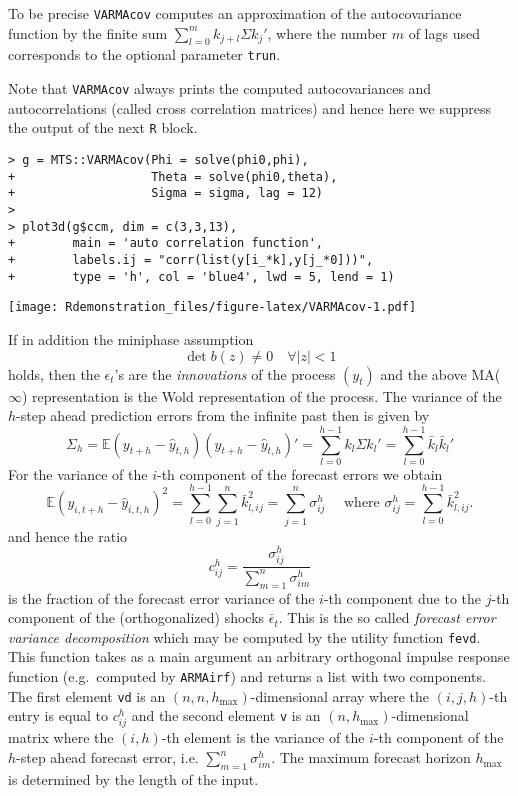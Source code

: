 \documentclass[]{article}
\begin{document}
To be precise \texttt{VARMAcov} computes an approximation of the
autocovariance function by the finite sum
\(\sum_{l=0}^{m} k_{j+l}\Sigma k_j'\), where the number \(m\) of lags
used corresponds to the optional parameter \texttt{trun}.

Note that \texttt{VARMAcov} always prints the computed autocovariances
and autocorrelations (called cross correlation matrices) and hence here
we suppress the output of the next \texttt{R} block.

\begin{verbatim}
> g = MTS::VARMAcov(Phi = solve(phi0,phi), 
+                   Theta = solve(phi0,theta), 
+                   Sigma = sigma, lag = 12)
> 
> plot3d(g$ccm, dim = c(3,3,13), 
+        main = 'auto correlation function', 
+        labels.ij = "corr(list(y[i_*k],y[j_*0]))",
+        type = 'h', col = 'blue4', lwd = 5, lend = 1)
\end{verbatim}

\texttt{[image: Rdemonstration\_files/figure-latex/VARMAcov-1.pdf]}

If in addition the miniphase assumption \[
\det b(z) \neq 0 \quad \forall |z| < 1
\] holds, then the \(\epsilon_t\)'s are the \emph{innovations} of the
process \((y_t)\) and the above MA(\(\infty\)) representation is the
Wold representation of the process. The variance of the \(h\)-step ahead
prediction errors from the infinite past then is given by \[
\Sigma_h = \mathbb{E}(y_{t+h}-\hat{y}_{t,h})(y_{t+h}-\hat{y}_{t,h})' = \sum_{l=0}^{h-1} k_l \Sigma k_l' = \sum_{l=0}^{h-1} \bar{k}_l \bar{k}_l'
\] For the variance of the \(i\)-th component of the forecast errors we
obtain \[
\mathbb{E}(y_{i,t+h}-\hat{y}_{i,t,h})^2 = \sum_{l=0}^{h-1} \sum_{j=1}^{n} \bar{k}_{l,ij}^2 = \sum_{j=1}^{n} \sigma^h_{ij} 
\quad \mbox{ where } \sigma^h_{ij} = \sum_{l=0}^{h-1} \bar{k}_{l,ij}^2.
\] and hence the ratio \[
c^h_{ij} = \frac{\sigma^h_{ij}}{\sum_{m=1}^n \sigma^h_{im}}
\] is the fraction of the forecast error variance of the \(i\)-th
component due to the \(j\)-th component of the (orthogonalized) shocks
\(\bar{\epsilon}_t\). This is the so called \emph{forecast error
variance decomposition} which may be computed by the utility function
\texttt{fevd}. This function takes as a main argument an arbitrary
orthogonal impulse response function (e.g.~computed by \texttt{ARMAirf})
and returns a list with two components. The first element \texttt{vd} is
an \((n,n,h_{\max})\)-dimensional array where the \((i,j,h)\)-th entry
is equal to \(c^h_{ij}\) and the second element \texttt{v} is an
\((n,h_{\max})\)-dimensional matrix where the \((i,h)\)-th element is
the variance of the \(i\)-th component of the \(h\)-step ahead forecast
error, i.e. \(\sum_{m=1}^n \sigma_{im}^h\). The maximum forecast horizon
\(h_{\max}\) is determined by the length of the input.
\end{document}
